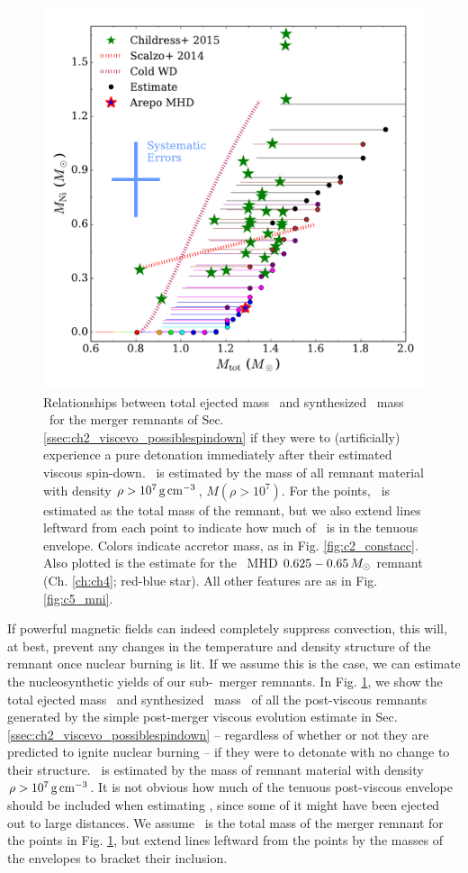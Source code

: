 \begin{figure}
\centering
\includegraphics[angle=0,width=0.8\columnwidth]{conclusion/figures/c_MNi.pdf}
\caption{Relationships between total ejected mass \Mtot\ and synthesized \Ni\ mass \MNi\ for the merger remnants of Sec. \ref{ssec:ch2_viscevo_possiblespindown} if they were to (artificially) experience a pure detonation immediately after their estimated viscous spin-down.  \MNi\ is estimated by the mass of all remnant material with density $\rho>10^7\,\gcc$, $M(\rho>10^7)$.  For the points, \Mtot\ is estimated as the total mass of the remnant, but we also extend lines leftward from each point to indicate how much of \Mtot\ is in the tenuous envelope.  Colors indicate accretor mass, as in Fig. \ref{fig:c2_constacc}.  Also plotted is the estimate for the \arepo\ MHD $0.625 - 0.65\,\Msun$ remnant (Ch. \ref{ch:ch4}; red-blue star).  All other features are as in Fig. \ref{fig:c5_mni}.}
\label{fig:c6_mcmce_mni}
\end{figure}

If powerful magnetic fields can indeed completely suppress convection, this will, at best, prevent any changes in the temperature and density structure of the remnant once nuclear burning is lit.  If we assume this is the case, we can estimate the nucleosynthetic yields of our sub-\Mch\ merger remnants.  In Fig. \ref{fig:c6_mcmce_mni}, we show the total ejected mass \Mtot\ and synthesized \Ni\ mass \MNi\ of all the post-viscous remnants generated by the simple post-merger viscous evolution estimate in Sec. \ref{ssec:ch2_viscevo_possiblespindown} -- regardless of whether or not they are predicted to ignite nuclear burning -- if they were to detonate with no change to their structure.  \MNi\ is estimated by the mass of remnant material with density $\rho>10^7\,\gcc$.  It is not obvious how much of the tenuous post-viscous envelope should be included when estimating \Mtot, since some of it might have been ejected out to large distances.  We assume \Mtot\ is the total mass of the merger remnant for the points in Fig. \ref{fig:c6_mcmce_mni}, but extend lines leftward from the points by the masses of the envelopes to bracket their inclusion.

